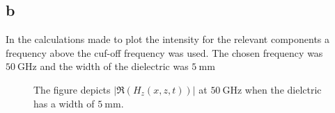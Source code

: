 \documentclass{article}
\begin{document}
\subsection{b}\label{sec:b}
In the calculations made to plot the intensity for the relevant components a frequency above the cuf-off frequency was used. The chosen frequency was $\SI{50}{\giga\hertz}$ and the width of the dielectric was $\SI{5}{\milli\metre}$
\begin{figure}
  \centering
  \noindent{}
  \caption{The figure depicts $|\Re(H_z(x,z,t))|$ at $\SI{50}{\giga\hertz}$ when the dielctric has a width of $\SI{5}{\milli\metre}$.}
  \label{fig:h_z}
\end{figure}
\end{document}

